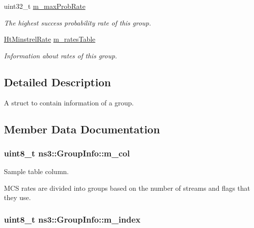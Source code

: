 \begin{DoxyCompactItemize}
uint32\+\_\+t \hyperlink{structns3_1_1GroupInfo_a2c8beb4988dd5bd00f75983abd5df018}{m\+\_\+max\+Prob\+Rate}
\begin{DoxyCompactList}\small\item\em The highest success probability rate of this group. \end{DoxyCompactList}\item 
\hyperlink{namespacens3_a82a9f8aa0dbfba7f85c109bb124ff5b3}{Ht\+Minstrel\+Rate} \hyperlink{structns3_1_1GroupInfo_a57b32791a66a332907a87e6322a4eb45}{m\+\_\+rates\+Table}
\begin{DoxyCompactList}\small\item\em Information about rates of this group. \end{DoxyCompactList}\end{DoxyCompactItemize}


\subsection{Detailed Description}
A struct to contain information of a group. 

\subsection{Member Data Documentation}
\subsubsection[{\texorpdfstring{m\+\_\+col}{m_col}}]{\setlength{\rightskip}{0pt plus 5cm}uint8\+\_\+t ns3\+::\+Group\+Info\+::m\+\_\+col}\hypertarget{structns3_1_1GroupInfo_ad47bd3477b8a798eecdbcf33610d2a9a}{}\label{structns3_1_1GroupInfo_ad47bd3477b8a798eecdbcf33610d2a9a}


Sample table column. 

M\+CS rates are divided into groups based on the number of streams and flags that they use. 
\subsubsection[{\texorpdfstring{m\+\_\+index}{m_index}}]{\setlength{\rightskip}{0pt plus 5cm}uint8\+\_\+t ns3\+::\+Group\+Info\+::m\+\_\+index}\hypertarget{structns3_1_1GroupInfo_a42c8e704ebaf910a2211b8300a85c5ff}{}\label{structns3_1_1GroupInfo_a42c8e704ebaf910a2211b8300a85c5ff}


